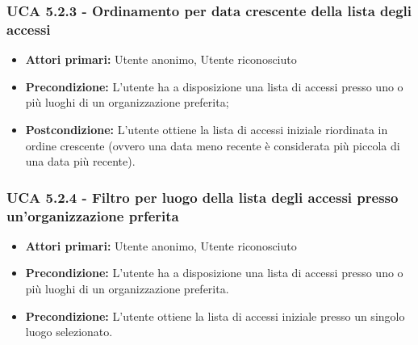 \subsubsection{UCA 5.2.3 - Ordinamento per data crescente della lista degli accessi}
\begin{itemize}
    \item \textbf{Attori primari:} Utente anonimo, Utente riconosciuto
    \item \textbf{Precondizione:} L'utente ha a disposizione una lista di accessi presso uno o più luoghi di un organizzazione preferita;
    \item \textbf{Postcondizione:} L'utente ottiene la lista di accessi iniziale riordinata in ordine crescente (ovvero una data meno recente è considerata più piccola di una data più recente).
\end{itemize}

\subsubsection{UCA 5.2.4 - Filtro per luogo della lista degli accessi presso un'organizzazione prferita}
\begin{itemize}
    \item \textbf{Attori primari:} Utente anonimo, Utente riconosciuto
    \item \textbf{Precondizione:} L'utente ha a disposizione una lista di accessi presso uno o più luoghi di un organizzazione preferita.
    \item \textbf{Precondizione:} L'utente ottiene la lista di accessi iniziale presso un singolo luogo selezionato.
\end{itemize}